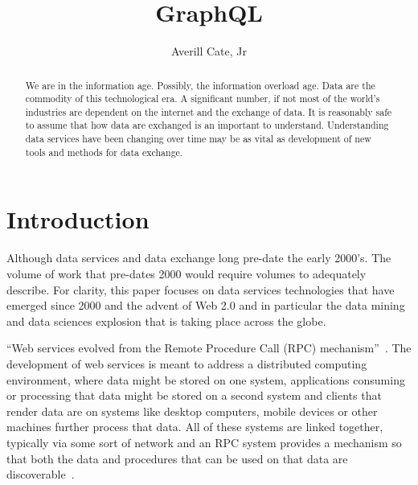 
\title{GraphQL}

\author{Averill Cate, Jr}

\renewcommand{\shortauthors}{A. Cate, Jr}

\begin{abstract}
We are in the information age.  Possibly, the information overload age.
Data are the commodity of this technological era.  A significant number, if not
most of the world's industries are dependent on the internet and the exchange
of data.  It is reasonably safe to assume that how data are exchanged is
an important to understand.  Understanding data services have been changing
over time may be as vital as development of new tools and methods for data
exchange.
\end{abstract}


\maketitle

\section{Introduction}
Although data services and data exchange long pre-date the early 2000's.  The
volume of work that pre-dates 2000 would require volumes to adequately describe.
For clarity, this paper focuses on data services technologies that have emerged
since 2000 and the advent of Web 2.0 and in particular the data mining and
data sciences explosion that is taking place across the globe.

``Web services evolved from the Remote Procedure Call (RPC)
mechanism''~\cite{hid505Kalin2009}.  The development of web services is
meant to address a distributed computing environment, where data might
be stored on one system, applications consuming or processing that
data might be stored on a second system and clients that render data
are on systems like desktop computers, mobile devices or other
machines further process that data.  All of these systems are linked
together, typically via some sort of network and an RPC system
provides a mechanism so that both the data and procedures that can be
used on that data are discoverable~\cite{hid505Kalin2009}.

